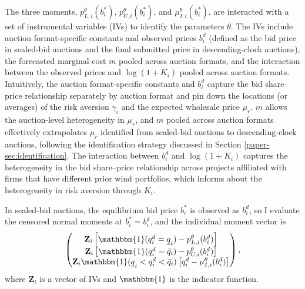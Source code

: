 \documentclass[12pt]{article}
\theoremstyle{definition} %
\newcommand{\I}{\mathbbm{1}}
\begin{document}
The three moments, $p_{L,i}^\theta(b_i^\ast)$, $p_{U,i}^\theta(b_i^\ast)$, and $\mu_{I,i}^\theta(b_i^\ast)$, are interacted with a set of instrumental variables (IVs) to identify the parameters $\theta$. The IVs include auction format-specific constants and observed prices $b_i^d$ (defined as the bid price in sealed-bid auctions and the final submitted price in descending-clock auctions), the forecasted marginal cost $m$ pooled across auction formats, and the interaction between the observed prices and $\log(1+K_i)$ pooled across auction formats. Intuitively, the auction format-specific constants and \(b_i^d\) capture the bid share--price relationship separately by auction format and pin down the locations (or averages) of the risk aversion \(\gamma_i\) and the expected wholesale price \(\mu_r\). $m$ allows the auction-level heterogeneity in $\mu_r$, and $m$ pooled across auction formats effectively extrapolates $\mu_r$ identified from sealed-bid auctions to descending-clock auctions, following the identification strategy discussed in Section \ref{paper-sec:identification}. The interaction between $b_i^d$ and $\log(1+K_i)$ captures the heterogeneity in the bid share--price relationship across projects affiliated with firms that have different prior wind portfolios, which informs about the heterogeneity in risk aversion through $K_i$.

In sealed-bid auctions, the equilibrium bid price $b_i^\ast$ is observed as $b_i^d$, so I evaluate the censored normal moments at $b_i^\ast=b_i^d$, and the individual moment vector is
\begin{align*}
\begin{pmatrix}
\mathbf{Z}_i \left[\I(q_i^d=\underline{q}_i)-p_{L,i}^\theta(b_i^d)\right] \\
\mathbf{Z}_i \left[\I(q_i^d=\bar{q}_i)-p_{U,i}^\theta(b_i^d)\right] \\
\mathbf{Z}_i \I(\underline{q}_i<q_i^d<\bar{q}_i)\left[q_i^d-\mu_{I,i}^\theta(b_i^d)\right]
\end{pmatrix},
\end{align*}
where $\mathbf{Z}_i$ is a vector of IVs and $\I$ is the indicator function.
\end{document}
